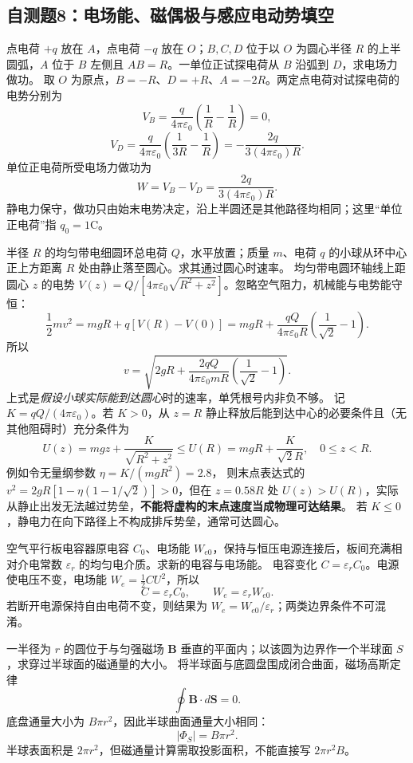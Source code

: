 \subsection{自测题8：电场能、磁偶极与感应电动势填空}

\problemtext 点电荷 $+q$ 放在 $A$，点电荷 $-q$ 放在 $O$；$B,C,D$ 位于以 $O$ 为圆心半径 $R$ 的上半圆弧，$A$ 位于 $B$ 左侧且 $AB=R$。一单位正试探电荷从 $B$ 沿弧到 $D$，求电场力做功。
\workings 取 $O$ 为原点，$B=-R$、$D=+R$、$A=-2R$。两定点电荷对试探电荷的电势分别为
\[V_B=\frac q{4\pi\varepsilon_0}\left(\frac1R-\frac1R\right)=0,\]
\[V_D=\frac q{4\pi\varepsilon_0}\left(\frac1{3R}-\frac1R\right)
=-\frac{2q}{3(4\pi\varepsilon_0)R}.\]
单位正电荷所受电场力做功为
\[\boxed{W=V_B-V_D=\frac{2q}{3(4\pi\varepsilon_0)R}}.\]
\crosscheck 静电力保守，做功只由始末电势决定，沿上半圆还是其他路径均相同；这里“单位正电荷”指 $q_0=1$C。

\problemtext 半径 $R$ 的均匀带电细圆环总电荷 $Q$，水平放置；质量 $m$、电荷 $q$ 的小球从环中心正上方距离 $R$ 处由静止落至圆心。求其通过圆心时速率。
\workings 均匀带电圆环轴线上距圆心 $z$ 的电势 $V(z)=Q/[4\pi\varepsilon_0\sqrt{R^2+z^2}]$。忽略空气阻力，机械能与电势能守恒：
\[
\frac12 mv^2=mgR+q[V(R)-V(0)]
=mgR+\frac{qQ}{4\pi\varepsilon_0R}
\left(\frac1{\sqrt2}-1\right).
\]
所以
\[
\boxed{v=\sqrt{2gR+\frac{2qQ}{4\pi\varepsilon_0mR}
\left(\frac1{\sqrt2}-1\right)}}.
\]
\crosscheck 上式是\emph{假设小球实际能到达圆心}时的速率，单凭根号内非负不够。
记 $K=qQ/(4\pi\varepsilon_0)$。若 $K>0$，从 $z=R$ 静止释放后能到达中心的必要条件且（无其他阻碍时）充分条件为
\[
U(z)=mgz+\frac{K}{\sqrt{R^2+z^2}}\le
U(R)=mgR+\frac{K}{\sqrt2R},\quad 0\le z<R.
\]
例如令无量纲参数 $\eta=K/(mgR^2)=2.8$，
则末点表达式的 $v^2=2gR[1-\eta(1-1/\sqrt2)]>0$，但在 $z=0.58R$ 处 $U(z)>U(R)$，实际从静止出发无法越过势垒，\textbf{不能将虚构的末点速度当成物理可达结果}。
若 $K\le0$，静电力在向下路径上不构成排斥势垒，通常可达圆心。

\problemtext 空气平行板电容器原电容 $C_0$、电场能 $W_{e0}$，保持与恒压电源连接后，板间充满相对介电常数 $\varepsilon_r$ 的均匀电介质。求新的电容与电场能。
\workings 电容变化 $C=\varepsilon_r C_0$。电源使电压不变，电场能 $W_e=\tfrac12 C U^2$，所以
\[\boxed{C=\varepsilon_r C_0},\qquad
\boxed{W_e=\varepsilon_r W_{e0}}.
\]
\crosscheck 若断开电源保持自由电荷不变，则结果为 $W_e=W_{e0}/\varepsilon_r$；两类边界条件不可混淆。

\problemtext 一半径为 $r$ 的圆位于与匀强磁场 $\bm B$ 垂直的平面内；以该圆为边界作一个半球面 $S$，求穿过半球面的磁通量的大小。
\workings 将半球面与底圆盘围成闭合曲面，磁场高斯定律
\[\oint\bm B\cdot d\bm S=0.\]
底盘通量大小为 $B\pi r^2$，因此半球曲面通量大小相同：
\[\boxed{|\Phi_S|=B\pi r^2}.\]
\crosscheck 半球表面积是 $2\pi r^2$，但磁通量计算需取投影面积，不能直接写 $2\pi r^2B$。

